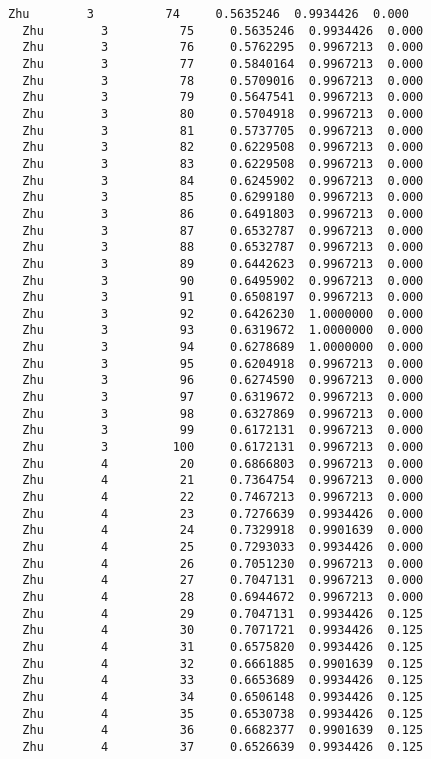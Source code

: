 \documentclass[11pt]{article}
\begin{document}
\begin{Verbatim}[commandchars=\\\{\}]
  Zhu        3          74     0.5635246  0.9934426  0.000
  Zhu        3          75     0.5635246  0.9934426  0.000
  Zhu        3          76     0.5762295  0.9967213  0.000
  Zhu        3          77     0.5840164  0.9967213  0.000
  Zhu        3          78     0.5709016  0.9967213  0.000
  Zhu        3          79     0.5647541  0.9967213  0.000
  Zhu        3          80     0.5704918  0.9967213  0.000
  Zhu        3          81     0.5737705  0.9967213  0.000
  Zhu        3          82     0.6229508  0.9967213  0.000
  Zhu        3          83     0.6229508  0.9967213  0.000
  Zhu        3          84     0.6245902  0.9967213  0.000
  Zhu        3          85     0.6299180  0.9967213  0.000
  Zhu        3          86     0.6491803  0.9967213  0.000
  Zhu        3          87     0.6532787  0.9967213  0.000
  Zhu        3          88     0.6532787  0.9967213  0.000
  Zhu        3          89     0.6442623  0.9967213  0.000
  Zhu        3          90     0.6495902  0.9967213  0.000
  Zhu        3          91     0.6508197  0.9967213  0.000
  Zhu        3          92     0.6426230  1.0000000  0.000
  Zhu        3          93     0.6319672  1.0000000  0.000
  Zhu        3          94     0.6278689  1.0000000  0.000
  Zhu        3          95     0.6204918  0.9967213  0.000
  Zhu        3          96     0.6274590  0.9967213  0.000
  Zhu        3          97     0.6319672  0.9967213  0.000
  Zhu        3          98     0.6327869  0.9967213  0.000
  Zhu        3          99     0.6172131  0.9967213  0.000
  Zhu        3         100     0.6172131  0.9967213  0.000
  Zhu        4          20     0.6866803  0.9967213  0.000
  Zhu        4          21     0.7364754  0.9967213  0.000
  Zhu        4          22     0.7467213  0.9967213  0.000
  Zhu        4          23     0.7276639  0.9934426  0.000
  Zhu        4          24     0.7329918  0.9901639  0.000
  Zhu        4          25     0.7293033  0.9934426  0.000
  Zhu        4          26     0.7051230  0.9967213  0.000
  Zhu        4          27     0.7047131  0.9967213  0.000
  Zhu        4          28     0.6944672  0.9967213  0.000
  Zhu        4          29     0.7047131  0.9934426  0.125
  Zhu        4          30     0.7071721  0.9934426  0.125
  Zhu        4          31     0.6575820  0.9934426  0.125
  Zhu        4          32     0.6661885  0.9901639  0.125
  Zhu        4          33     0.6653689  0.9934426  0.125
  Zhu        4          34     0.6506148  0.9934426  0.125
  Zhu        4          35     0.6530738  0.9934426  0.125
  Zhu        4          36     0.6682377  0.9901639  0.125
  Zhu        4          37     0.6526639  0.9934426  0.125

\end{Verbatim}
\end{document}
